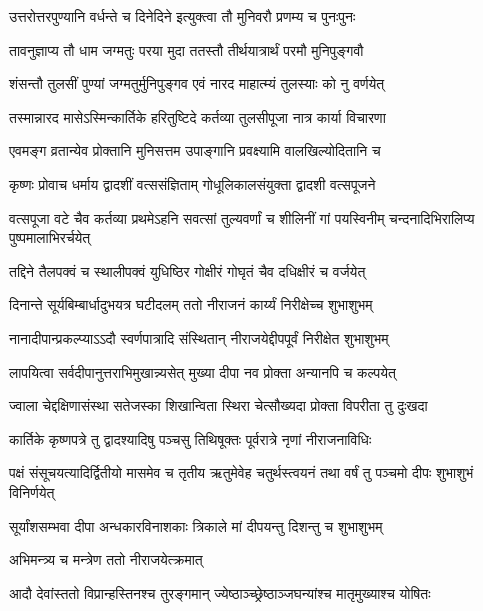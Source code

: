 \twolineshloka
{उत्तरोत्तरपुण्यानि वर्धन्ते च दिनेदिने}
{इत्युक्त्वा तौ मुनिवरौ प्रणम्य च पुनःपुनः} %

\twolineshloka
{तावनुज्ञाप्य तौ धाम जग्मतुः परया मुदा}
{ततस्तौ तीर्थयात्रार्थं परमौ मुनिपुङ्गवौ} %

\twolineshloka
{शंसन्तौ तुलसीं पुण्यां जग्मतुर्मुनिपुङ्गव}
{एवं नारद माहात्म्यं तुलस्याः को नु वर्णयेत्} %

\twolineshloka
{तस्मान्नारद मासेऽस्मिन्कार्तिके हरितुष्टिदे}
{कर्तव्या तुलसीपूजा नात्र कार्या विचारणा} %

\twolineshloka
{एवमङ्ग व्रतान्येव प्रोक्तानि मुनिसत्तम}
{उपाङ्गानि प्रवक्ष्यामि वालखिल्योदितानि च} %





\twolineshloka
{कृष्णः प्रोवाच धर्माय द्वादशीं वत्ससंज्ञिताम्}
{गोधूलिकालसंयुक्ता द्वादशी वत्सपूजने} %

\threelineshloka
{वत्सपूजा वटे चैव कर्तव्या प्रथमेऽहनि}
{सवत्सां तुल्यवर्णां च शीलिनीं गां पयस्विनीम्}
{चन्दनादिभिरालिप्य पुष्पमालाभिरर्चयेत्} %

\twolineshloka
{तद्दिने तैलपक्वं च स्थालीपक्वं युधिष्ठिर}
{गोक्षीरं गोघृतं चैव दधिक्षीरं च वर्जयेत्} %

\twolineshloka
{दिनान्ते सूर्यबिम्बार्धादुभयत्र घटीदलम्}
{ततो नीराजनं कार्य्यं निरीक्षेच्च शुभाशुभम्} %

\twolineshloka
{नानादीपान्प्रकल्प्याऽऽदौ स्वर्णपात्रादि संस्थितान्}
{नीराजयेद्दीपपूर्वं निरीक्षेत शुभाशुभम्} %

\twolineshloka
{लापयित्वा सर्वदीपानुत्तराभिमुखान्न्यसेत्}
{मुख्या दीपा नव प्रोक्ता अन्यानपि च कल्पयेत्} %

\twolineshloka
{ज्वाला चेद्दक्षिणासंस्था सतेजस्का शिखान्विता}
{स्थिरा चेत्सौख्यदा प्रोक्ता विपरीता तु दुःखदा} %

\twolineshloka
{कार्तिके कृष्णपत्रे तु द्वादश्यादिषु पञ्चसु}
{तिथिषूक्तः पूर्वरात्रे नृणां नीराजनाविधिः} %

\threelineshloka
{पक्षं संसूचयत्यादिर्द्वितीयो मासमेव च}
{तृतीय ऋतुमेवेह चतुर्थस्त्वयनं तथा}
{वर्षं तु पञ्चमो दीपः शुभाशुभं विनिर्णयेत्} %

\twolineshloka
{सूर्यांशसम्भवा दीपा अन्धकारविनाशकाः}
{त्रिकाले मां दीपयन्तु दिशन्तु च शुभाशुभम्} %


\onelineshloka
{अभिमन्त्र्य च मन्त्रेण ततो नीराजयेत्क्रमात्} %

\twolineshloka
{आदौ देवांस्ततो विप्रान्हस्तिनश्च तुरङ्गमान्}
{ज्येष्ठाञ्च्छ्रेष्ठाञ्जघन्यांश्च मातृमुख्याश्च योषितः} %

